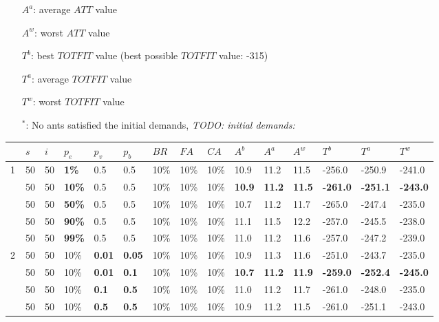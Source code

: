 \begin{sidewaystable}
\begin{itemize}[noitemsep]
    \item[$A^a$:] average $ATT$ value
    \item[$A^w$:] worst $ATT$ value
    \item[$T^b$:] best $TOTFIT$ value (best possible $TOTFIT$ value: -315)
    \item[$T^a$:] average $TOTFIT$ value
    \item[$T^w$:] worst $TOTFIT$ value
    \item[$^*$:] No ants satisfied the initial demands, \emph{\color{blue} TODO: initial demands: }
    \end{itemize}
    \label{table:pm2}
\end{sidewaystable}

\begin{table}
    \tiny
    \hspace*{-1.5cm}
	\begin{tabular}{|l|l|l|l|l|l|l|l|l||l|l|l|l|l|l|}
 	\hline
 	~ & $s$ & $i$ & $p_{e}$ & $p_{v}$ & $p_{b}$ & $BR$ & $FA$ & $CA$ & $A^b$ & $A^a$ & $A^w$ & $T^b$ & $T^a$ & $T^w$\\
 	\hline
    1 & 50 & 50 & \textbf{1\%} & 0.5 & 0.5 & 10\% & 10\% & 10\% & 10.9 & 11.2 & 11.5 & -256.0 & -250.9 & -241.0  \\
    ~ & 50 & 50 & \textbf{10\%} & 0.5 & 0.5 & 10\% & 10\% & 10\% & \textbf{10.9} & \textbf{11.2} & \textbf{11.5} & \textbf{-261.0} & \textbf{-251.1} & \textbf{-243.0} \\
    ~ & 50 & 50 & \textbf{50\%} & 0.5 & 0.5 & 10\% & 10\% & 10\% & 10.7 & 11.2 & 11.7 & -265.0 & -247.4 & -235.0  \\
    ~ & 50 & 50 & \textbf{90\%} & 0.5 & 0.5 & 10\% & 10\% & 10\% & 11.1 & 11.5 & 12.2 & -257.0 & -245.5 & -238.0  \\
    ~ & 50 & 50 & \textbf{99\%} & 0.5 & 0.5 & 10\% & 10\% & 10\% & 11.0 & 11.2 & 11.6 & -257.0 & -247.2 & -239.0  \\
    \hline
    2 & 50 & 50 & 10\% & \textbf{0.01} & \textbf{0.05} & 10\% & 10\% & 10\% & 10.9 & 11.3 & 11.6 & -251.0 & -243.7 & -235.0 \\
    ~ & 50 & 50 & 10\% & \textbf{0.01} & \textbf{0.1} & 10\% & 10\% & 10\% & \textbf{10.7} & \textbf{11.2} & \textbf{11.9} & \textbf{-259.0} & \textbf{-252.4} & \textbf{-245.0} \\
    ~ & 50 & 50 & 10\% & \textbf{0.1} & \textbf{0.5} & 10\% & 10\% & 10\% & 11.0 & 11.2 & 11.7 & -261.0 & -248.0 & -235.0 \\
    ~ & 50 & 50 & 10\% & \textbf{0.5} & \textbf{0.5} & 10\% & 10\% & 10\% & 10.9 & 11.2 & 11.5 & -261.0 & -251.1 & -243.0 \\

\end{tabular}
\end{table}
